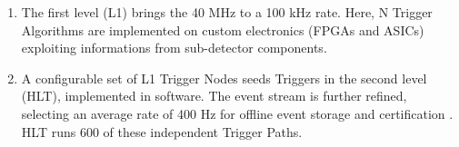 \begin{enumerate}

	\item The first level (L1) \cite{Bayatyan:706847} brings the 40 MHz to a 100 kHz rate. Here, N Trigger Algorithms are implemented on custom electronics (FPGAs and ASICs) exploiting informations from sub-detector components.

	\item A configurable set of L1 Trigger Nodes seeds Triggers in the second level (HLT), implemented in software. The event stream is further refined, selecting an average rate of 400 Hz for offline event storage and certification \cite{Khachatryan_2017}. HLT runs 600 of these independent Trigger Paths.

\end{enumerate}